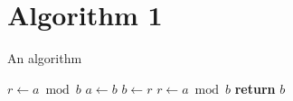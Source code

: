 \documentclass[11pt]{amsart}
\begin{document}
\section{Algorithm 1}


\begin{algorithm}
  \caption{An algorithm}
  \begin{algorithmic}[1]
      \State $r \gets a \bmod b$
        \State $a \gets b$
        \State $b \gets r$
        \State $r \gets a \bmod b$
      \EndWhile\label{euclidendwhile}
      \State \textbf{return} $b$
    \EndProcedure
  \end{algorithmic}
\end{algorithm}
\end{document}
